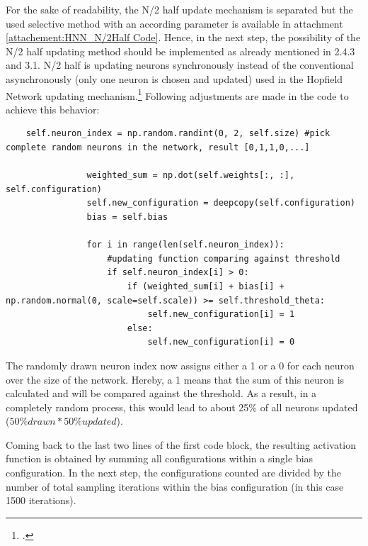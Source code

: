 For the sake of readability, the N/2 half update mechanism is separated but the used selective method with an according parameter is available in attachment \ref{attachement:HNN_N/2Half Code}.
Hence, in the next step, the possibility of the N/2 half updating method should be implemented as already mentioned in 2.4.3 and 3.1.
N/2 half is updating neurons synchronously instead of the conventional asynchronously (only one neuron is chosen and updated) used in the Hopfield Network updating mechanism.\footcite[cf.][23-24]{caiHarnessingIntrinsicNoise2019}
Following adjustments are made in the code to achieve this behavior:
\begin{lstlisting}
    self.neuron_index = np.random.randint(0, 2, self.size) #pick complete random neurons in the network, result [0,1,1,0,...]

                weighted_sum = np.dot(self.weights[:, :], self.configuration)   
                self.new_configuration = deepcopy(self.configuration)
                bias = self.bias 

                for i in range(len(self.neuron_index)):              
                    #updating function comparing against threshold
                    if self.neuron_index[i] > 0:
                        if (weighted_sum[i] + bias[i] + np.random.normal(0, scale=self.scale)) >= self.threshold_theta:          
                            self.new_configuration[i] = 1
                        else:
                            self.new_configuration[i] = 0
\end{lstlisting}
The randomly drawn neuron index now assigns either a 1 or a 0 for each neuron over the size of the network.
Hereby, a 1 means that the sum of this neuron is calculated and will be compared against the threshold. 
As a result, in a completely random process, this would lead to about 25\% of all neurons updated (\(50\% drawn * 50\% updated\)).

Coming back to the last two lines of the first code block, the resulting activation function is obtained by summing all configurations within a single bias configuration.
In the next step, the configurations counted are divided by the number of total sampling iterations within the bias configuration (in this case 1500 iterations).

